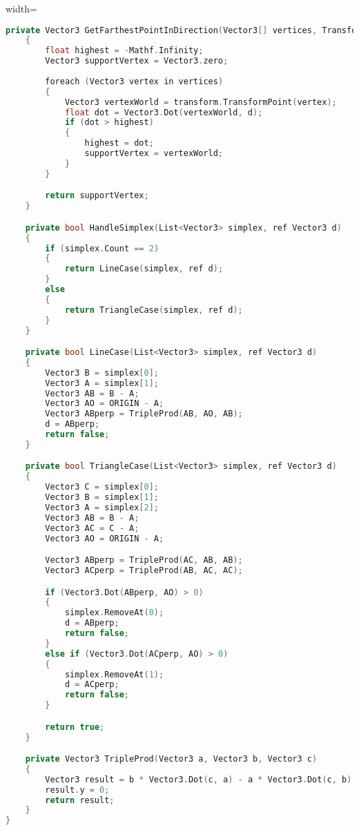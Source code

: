 \begin{adjustbox}{width=\textwidth}
\begin{lstlisting}[language=C++]
    private Vector3 GetFarthestPointInDirection(Vector3[] vertices, Transform transform, Vector3 d)
    {
        float highest = -Mathf.Infinity;
        Vector3 supportVertex = Vector3.zero;
        
        foreach (Vector3 vertex in vertices)
        {
            Vector3 vertexWorld = transform.TransformPoint(vertex);
            float dot = Vector3.Dot(vertexWorld, d);
            if (dot > highest)
            {
                highest = dot;
                supportVertex = vertexWorld;
            }
        }

        return supportVertex;
    }

    private bool HandleSimplex(List<Vector3> simplex, ref Vector3 d)
    {
        if (simplex.Count == 2)
        {
            return LineCase(simplex, ref d);
        }
        else
        {
            return TriangleCase(simplex, ref d);
        }
    }

    private bool LineCase(List<Vector3> simplex, ref Vector3 d)
    {
        Vector3 B = simplex[0];
        Vector3 A = simplex[1];
        Vector3 AB = B - A;
        Vector3 AO = ORIGIN - A;
        Vector3 ABperp = TripleProd(AB, AO, AB);
        d = ABperp;
        return false;
    }

    private bool TriangleCase(List<Vector3> simplex, ref Vector3 d)
    {
        Vector3 C = simplex[0];
        Vector3 B = simplex[1];
        Vector3 A = simplex[2];
        Vector3 AB = B - A;
        Vector3 AC = C - A;
        Vector3 AO = ORIGIN - A;

        Vector3 ABperp = TripleProd(AC, AB, AB);
        Vector3 ACperp = TripleProd(AB, AC, AC);

        if (Vector3.Dot(ABperp, AO) > 0)
        {
            simplex.RemoveAt(0);
            d = ABperp;
            return false;
        }
        else if (Vector3.Dot(ACperp, AO) > 0)
        {
            simplex.RemoveAt(1);
            d = ACperp;
            return false;
        }

        return true;
    }

    private Vector3 TripleProd(Vector3 a, Vector3 b, Vector3 c)
    {
        Vector3 result = b * Vector3.Dot(c, a) - a * Vector3.Dot(c, b);
        result.y = 0;
        return result;
    }
}
\end{lstlisting}
\end{adjustbox}









\